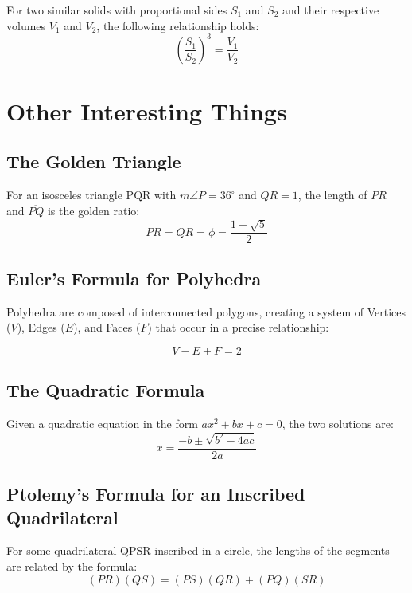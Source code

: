 \documentclass[final, letterpaper, 12pt]{article}
\begin{document}
		For two similar solids with proportional sides $S_1$ and $S_2$ and their respective volumes $V_1$ and $V_2$, the following relationship holds:
		\begin{equation}
			\left( \frac{S_1}{S_2} \right) ^3 = \frac{V_1}{V_2}
		\end{equation}
		
\section{Other Interesting Things}
	\subsection{The Golden Triangle}\label{sec: 36-72-72 triangle and value of phi}
	For an isosceles triangle PQR with $m\angle P = 36 ^{\circ}$ and $\overline{QR} = 1$, the length of $\overline{PR}$ and $\overline{PQ}$ is the golden ratio:
		\begin{equation}
			PR = QR = \phi = \frac{1 + \sqrt{5}}{2}
		\end{equation}
	
	\subsection{Euler's Formula for Polyhedra}\label{sec: a relationship between vertices, edges, and faces in polyhedra}
		Polyhedra are composed of interconnected polygons, creating a system of Vertices ($V$), Edges ($E$), and Faces ($F$) that occur in a precise relationship:
		
		\begin{equation}
			V-E+F = 2
		\end{equation}
	
	\subsection{The Quadratic Formula}\label{sec: one of the most commonly used things in math team}
		Given a quadratic equation in the form $ax^2+bx+c = 0$, the two solutions are:
		\begin{equation}
			x = \frac{-b\pm \sqrt{b^2-4ac}}{2a}
		\end{equation}
	
	\subsection{Ptolemy's Formula for an Inscribed Quadrilateral}\label{sec: formula relating the distances between the vertices of an inscribed quadrilateral}
		For some quadrilateral QPSR inscribed in a circle, the lengths of the segments are related by the formula:
		\begin{equation}
			(PR)(QS) = (PS)(QR) + (PQ)(SR)
		\end{equation}
		
\end{document}
